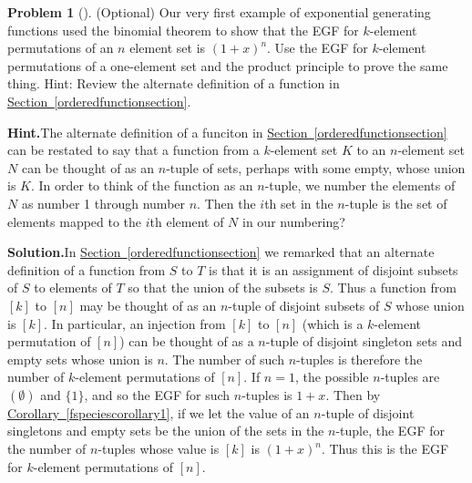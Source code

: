 \documentclass[10pt,]{book}
\theoremstyle{plain}
\theoremstyle{definition}
\newtheorem{activity}[project]{Problem}
\theoremstyle{definition}
\numberwithin{equation}{chapter}
\begin{document}
\begin{activity}[]\label{activity-403}
(Optional) Our very first example of exponential generating functions used the binomial theorem to show that the EGF for \(k\)-element permutations of an \(n\) element set is \((1+x)^n\). Use the EGF for \(k\)-element permutations of a one-element set and the product principle to prove the same thing. Hint: Review the alternate definition of a function in \hyperref[orderedfunctionsection]{Section~\ref{orderedfunctionsection}}.%
\par\medskip\noindent%
\textbf{Hint.}\quad The alternate definition of a funciton in \hyperref[orderedfunctionsection]{Section~\ref{orderedfunctionsection}} can be restated to say that a function from a \(k\)-element set \(K\) to an \(n\)-element set \(N\) can be thought of as an \(n\)-tuple of sets, perhaps with some empty, whose union is \(K\). In order to think of the function as an \(n\)-tuple, we number the elements of \(N\) as number 1 through number \(n\). Then the \(i\)th set in the \(n\)-tuple is the set of elements mapped to the \(i\)th element of \(N\) in our numbering?%
\par\medskip\noindent%
\textbf{Solution.}\quad In \hyperref[orderedfunctionsection]{Section~\ref{orderedfunctionsection}} we remarked that an alternate definition of a function from \(S\) to \(T\) is that it is an assignment of disjoint subsets of \(S\) to elements of \(T\) so that the union of the subsets is \(S\). Thus a function from \([k]\) to \([n]\) may be thought of as an \(n\)-tuple of disjoint subsets of \(S\) whose union is \([k]\). In particular, an injection from \([k]\) to \([n]\) (which is a \(k\)-element permutation of \([n]\)) can be thought of as a \(n\)-tuple of disjoint singleton sets and empty sets whose union is \(n\). The number of such \(n\)-tuples is therefore the number of \(k\)-element permutations of \([n]\). If \(n=1\), the possible \(n\)-tuples are \((\emptyset)\) and \(\{1\}\), and so the EGF for such \(n\)-tuples is \(1+x\). Then by \hyperref[fspeciescorollary1]{Corollary~\ref{fspeciescorollary1}}, if we let the value of an \(n\)-tuple of disjoint singletons and empty sets be the union of the sets in the \(n\)-tuple, the EGF for the number of \(n\)-tuples whose value is \([k]\) is \((1+x)^n\). Thus this is the EGF for \(k\)-element permutations of \([n]\).%
\end{activity}
\end{document}
